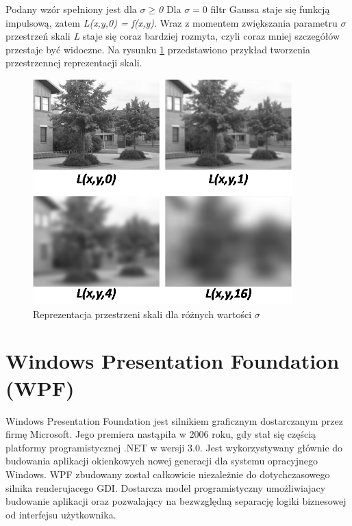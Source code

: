 Podany wzór spełniony jest dla \textit{$\sigma$$\geq$0}
Dla $\sigma = 0$ filtr Gaussa staje się funkcją impulsową, zatem \textit{L(x,y,0) = f(x,y)}. Wraz z momentem zwiększania parametru $\sigma$ przestrzeń skali \textit{L} staje się coraz bardziej rozmyta, czyli coraz mniej szczegółów przestaje być widoczne. Na rysunku \ref{im: Scale Space Representation} przedstawiono przykład tworzenia przestrzennej reprezentacji skali.
\begin{figure}[h]
	\includegraphics[width=10cm]{ScaleSpaceRepresentation}
	\centering
	\caption{Reprezentacja przestrzeni skali dla różnych wartości $\sigma$}
	\label{im: Scale Space Representation}
\end{figure} 

\section{Windows Presentation Foundation (WPF)}
Windows Presentation Foundation jest silnikiem graficznym dostarczanym przez firmę Microsoft. Jego premiera nastąpiła w 2006 roku, gdy stał się częścią platformy programistycznej .NET w wersji 3.0.  Jest wykorzystywany głównie do budowania aplikacji okienkowych nowej generacji dla systemu opracyjnego Windows. WPF zbudowany został całkowicie niezależnie do dotychczasowego silnika renderujacego GDI. Dostarcza model programistyczny umożliwiajacy budowanie aplikacji oraz pozwalający na bezwzględną separację logiki biznesowej od interfejsu użytkownika. 

